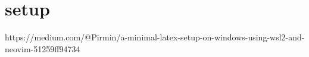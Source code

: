 \section*{setup}%
\label{sec:setup}
https://medium.com/@Pirmin/a-minimal-latex-setup-on-windows-using-wsl2-and-neovim-51259ff94734

